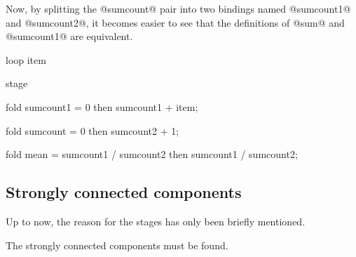 Now, by splitting the @sumcount@ pair into two bindings named @sumcount1@ and @sumcount2@, it becomes easier to see that the definitions of @sum@ and @sumcount1@ are equivalent.
\begin{code}
loop item {
  stage {
    fold sumcount1
     = 0
     then
       sumcount1 + item;

    fold sumcount
     = 0
     then
       sumcount2 + 1;

    fold mean
     = sumcount1 / sumcount2
     then
       sumcount1 / sumcount2;
  }
}
\end{code}



\subsection{Strongly connected components}
Up to now, the reason for the stages has only been briefly mentioned.

The strongly connected components must be found.

